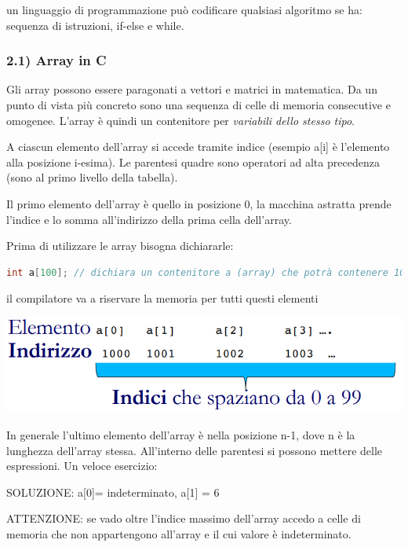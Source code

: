 \documentclass[
  paper=a4,
  oneside  ,captions=tableheading
]{scrbook}
\begin{document}
un linguaggio di programmazione può codificare qualsiasi algoritmo se
ha: sequenza di istruzioni, if-else e while.

\hypertarget{array-in-c}{%
\subsubsection{2.1) Array in C}\label{array-in-c}}

Gli array possono essere paragonati a vettori e matrici in matematica.
Da un punto di vista più concreto sono una sequenza di celle di memoria
consecutive e omogenee. L'array è quindi un contenitore per
\emph{variabili dello stesso tipo}.

A ciascun elemento dell'array si accede tramite indice (esempio a{[}i{]}
è l'elemento alla posizione i-esima). Le parentesi quadre sono operatori
ad alta precedenza (sono al primo livello della tabella).

Il primo elemento dell'array è quello in posizione 0, la macchina
astratta prende l'indice e lo somma all'indirizzo della prima cella
dell'array.

Prima di utilizzare le array bisogna dichiararle:

\begin{lstlisting}[language={C++}]
int a[100]; // dichiara un contenitore a (array) che potrà contenere 100 elementi di tipo int, il primo elemento lo si trova in a[0], l'ultimo in a[99]
\end{lstlisting}

il compilatore va a riservare la memoria per tutti questi elementi

\includegraphics{./image/image-20201208144533768-1607774562526.png}

In generale l'ultimo elemento dell'array è nella posizione n-1, dove n è
la lunghezza dell'array stessa. All'interno delle parentesi si possono
mettere delle espressioni. Un veloce esercizio:

SOLUZIONE: a{[}0{]}= indeterminato, a{[}1{]} = 6

ATTENZIONE: se vado oltre l'indice massimo dell'array accedo a celle di
memoria che non appartengono all'array e il cui valore è indeterminato.
\end{document}
